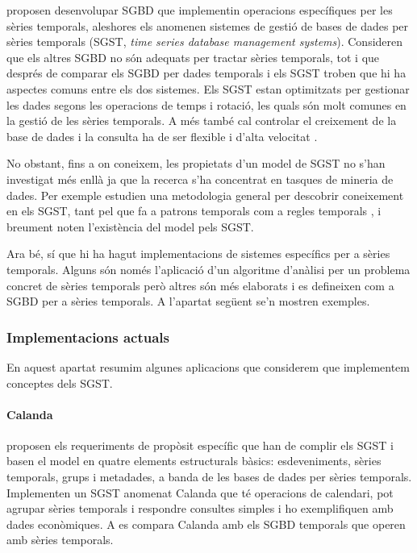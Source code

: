 \textcite{dreyer94} proposen desenvolupar SGBD que implementin operacions específiques per les sèries temporals, aleshores els anomenen sistemes de gestió de bases de dades per sèries temporals (SGST, \emph{time series database management systems}). Consideren que els altres SGBD no són adequats per tractar sèries temporals, tot i que després de comparar els SGBD per dades temporals i els SGST \parencite{schmidt95} troben que hi ha aspectes comuns entre els dos sistemes.
Els SGST estan optimitzats per gestionar les dades segons les operacions de temps i rotació, les quals són molt comunes en la gestió de les sèries temporals.  A més també cal controlar el creixement de la base de dades i la consulta ha de ser flexible i d'alta velocitat \parencite{keogh10:isax}. 

No obstant, fins a on coneixem, les propietats d'un model de SGST no s'han investigat més enllà  ja que la recerca s'ha concentrat en tasques de mineria de dades. Per exemple \textcite{last01} estudien una metodologia general per descobrir coneixement en els SGST, tant pel que fa a 
patrons temporals %
com a regles temporals%
, i breument noten l'existència del model \cite{dreyer94} pels SGST.


Ara bé, sí que hi ha hagut implementacions de sistemes específics per a sèries temporals. Alguns són només l'aplicació d'un algoritme d'anàlisi per un problema concret de sèries temporals però  altres  són més elaborats i es defineixen com a SGBD per a sèries temporals. A l'apartat següent se'n mostren exemples. 




\subsubsection{Implementacions actuals}

En aquest apartat resumim algunes aplicacions que considerem que implementem conceptes dels SGST.


\paragraph{Calanda} \textcite{dreyer94} proposen els requeriments de propòsit específic que han de complir els SGST i basen el model en quatre elements estructurals bàsics: esdeveniments, sèries temporals, grups i metadades, a banda de les bases de dades per sèries temporals. Implementen un SGST anomenat Calanda \parencite{dreyer94b,dreyer95,dreyer95b} que té operacions de calendari, pot agrupar sèries temporals i respondre consultes simples i ho exemplifiquen amb dades econòmiques. A \cite{schmidt95} es compara Calanda amb els SGBD temporals que operen amb sèries temporals. 




